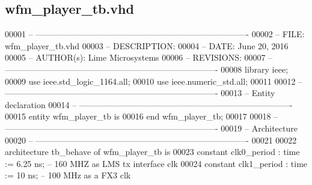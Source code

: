 \subsection{wfm\+\_\+player\+\_\+tb.\+vhd}
\label{wfm__player__tb_8vhd_source}

\begin{DoxyCode}
00001 \textcolor{keyword}{-- ---------------------------------------------------------------------------- }
00002 \textcolor{keyword}{-- FILE:    wfm\_player\_tb.vhd}
00003 \textcolor{keyword}{-- DESCRIPTION: }
00004 \textcolor{keyword}{-- DATE:    June 20, 2016}
00005 \textcolor{keyword}{-- AUTHOR(s):   Lime Microsystems}
00006 \textcolor{keyword}{-- REVISIONS:}
00007 \textcolor{keyword}{-- ---------------------------------------------------------------------------- }
00008 \textcolor{vhdlkeyword}{library }\textcolor{keywordflow}{ieee};
00009 \textcolor{vhdlkeyword}{use }ieee.std\_logic\_1164.\textcolor{keywordflow}{all};
00010 \textcolor{vhdlkeyword}{use }ieee.numeric\_std.\textcolor{keywordflow}{all};
00011 
00012 \textcolor{keyword}{-- ----------------------------------------------------------------------------}
00013 \textcolor{keyword}{-- Entity declaration}
00014 \textcolor{keyword}{-- ----------------------------------------------------------------------------}
00015 \textcolor{keywordflow}{entity }wfm_player_tb \textcolor{keywordflow}{is}
00016 \textcolor{keywordflow}{end} \textcolor{vhdlchar}{wfm\_player\_tb};
00017 
00018 \textcolor{keyword}{-- ----------------------------------------------------------------------------}
00019 \textcolor{keyword}{-- Architecture}
00020 \textcolor{keyword}{-- ----------------------------------------------------------------------------}
00021 
00022 \textcolor{keywordflow}{architecture} tb\_behave \textcolor{keywordflow}{of} wfm_player_tb is
00023     \textcolor{keywordflow}{constant} \textcolor{vhdlchar}{clk0_period}        \textcolor{vhdlchar}{:} \textcolor{comment}{time} \textcolor{vhdlchar}{:=} \textcolor{vhdllogic}{}\textcolor{vhdllogic}{6}.\textcolor{vhdllogic}{25} \textcolor{vhdlchar}{ns};\textcolor{keyword}{  -- 160 MHZ as LMS tx interface clk}
00024     \textcolor{keywordflow}{constant} \textcolor{vhdlchar}{clk1_period}        \textcolor{vhdlchar}{:} \textcolor{comment}{time} \textcolor{vhdlchar}{:=} \textcolor{vhdllogic}{}\textcolor{vhdllogic}{10} \textcolor{vhdlchar}{ns};\textcolor{keyword}{    -- 100 MHz as a FX3 clk}

\end{DoxyCode}
